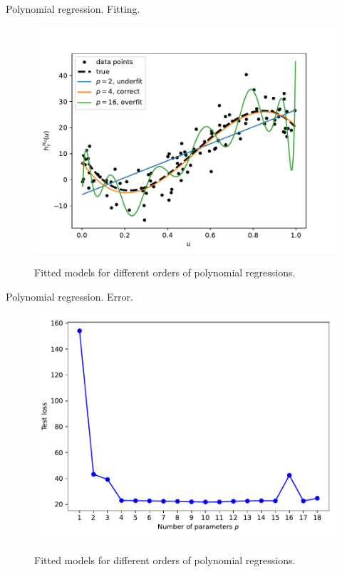 \documentclass{beamer}
\begin{document}
\begin{frame}{Polynomial regression. Fitting.}
  \begin{figure}
    \includegraphics[width=0.7\linewidth]{polyfitpy}
    \label{fig:polydatpy}
    \caption{Fitted models for different orders of polynomial regressions\cite{kroese2020}.}
  \end{figure}
\end{frame}

\begin{frame}{Polynomial regression. Error.}
  \begin{figure}
    \includegraphics[width=0.7\linewidth]{MSEpy}
    \label{fig:MSEpy}
    \caption{Fitted models for different orders of polynomial regressions\cite{kroese2020}.}
  \end{figure}
\end{frame}
\end{document}
